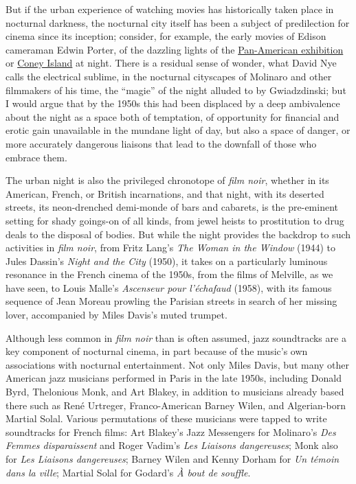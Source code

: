 \documentclass[
  letterpaper,
  DIV=11,
  numbers=noendperiod,
  oneside]{scrartcl}
\begin{document}
But if the urban experience of watching movies has historically taken
place in nocturnal darkness, the nocturnal city itself has been a
subject of predilection for cinema since its inception; consider, for
example, the early movies of Edison cameraman Edwin Porter, of the
dazzling lights of the \href{https://youtu.be/Q5m6joTlnqA}{Pan-American
exhibition} or \href{https://www.youtube.com/watch?v=NqDtG3dcxPs}{Coney
Island} at night. There is a residual sense of wonder, what David Nye
calls the electrical sublime, in the nocturnal cityscapes of Molinaro
and other filmmakers of his time, the ``magie'' of the night alluded to
by Gwiadzdinski; but I would argue that by the 1950s this had been
displaced by a deep ambivalence about the night as a space both of
temptation, of opportunity for financial and erotic gain unavailable in
the mundane light of day, but also a space of danger, or more accurately
dangerous liaisons that lead to the downfall of those who embrace them.

The urban night is also the privileged chronotope of \emph{film noir},
whether in its American, French, or British incarnations, and that
night, with its deserted streets, its neon-drenched demi-monde of bars
and cabarets, is the pre-eminent setting for shady goings-on of all
kinds, from jewel heists to prostitution to drug deals to the disposal
of bodies. But while the night provides the backdrop to such activities
in \emph{film noir}, from Fritz Lang's \emph{The Woman in the Window}
(1944) to Jules Dassin's \emph{Night and the City} (1950), it takes on a
particularly luminous resonance in the French cinema of the 1950s, from
the films of Melville, as we have seen, to Louis Malle's \emph{Ascenseur
pour l'échafaud} (1958), with its famous sequence of Jean Moreau
prowling the Parisian streets in search of her missing lover,
accompanied by Miles Davis's muted trumpet.

Although less common in \emph{film noir} than is often assumed, jazz
soundtracks are a key component of nocturnal cinema, in part because of
the music's own associations with nocturnal entertainment. Not only
Miles Davis, but many other American jazz musicians performed in Paris
in the late 1950s, including Donald Byrd, Thelonious Monk, and Art
Blakey, in addition to musicians already based there such as René
Urtreger, Franco-American Barney Wilen, and Algerian-born Martial Solal.
Various permutations of these musicians were tapped to write soundtracks
for French films: Art Blakey's Jazz Messengers for Molinaro's \emph{Des
Femmes disparaissent} and Roger Vadim's \emph{Les Liaisons dangereuses};
Monk also for \emph{Les Liaisons dangereuses}; Barney Wilen and Kenny
Dorham for \emph{Un témoin dans la ville}; Martial Solal for Godard's
\emph{À bout de souffle}.
\end{document}
